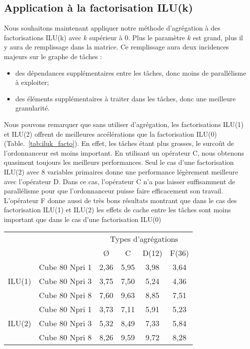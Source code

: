 \subsection{Application à la factorisation ILU(k)}
\label{sec:res_iluk}
Nous souhaitons maintenant appliquer notre méthode d'agrégation à des factorisations ILU(k) avec $k$ supérieur à 0.
%
Plus le paramètre $k$ est grand, plus il y aura de remplissage dans la matrice.
%
Ce remplissage aura deux incidences majeurs sur le graphe de tâches :
\begin{itemize}
  \item des dépendances supplémentaires entre les tâches, donc moins de parallélisme à exploiter;
  \item des éléments supplémentaires à traiter dans les tâches, donc une meilleure granularité.
\end{itemize}


Nous pouvons remarquer que sans utiliser d'agrégation, les factorisations ILU(1) et ILU(2) offrent de meilleures accélérations que la factorisation ILU(0) (Table.~\ref{tab:iluk_facto}).
%
En effet, les tâches étant plus grosses, le surcoût de l'ordonnanceur est moins important.
%
En utilisant un opérateur C, nous obtenons quasiment toujours les meilleurs performances.
%
Seul le cas d'une factorisation ILU(2) avec 8 variables primaires donne une performance légèrement meilleure avec l'opérateur D.
%
Dans ce cas, l'opérateur C n'a pas laisser suffisamment de parallélisme pour que l'ordonnanceur puisse faire efficacement son travail.
%
L'opérateur F donne aussi de très bons résultats montrant que dans le cas des factorisation ILU(1) et ILU(2) les effets de cache entre les tâches sont moins important que dans le cas d'une factorisation ILU(0)

\begin{center}
  \begin{tabular}{|c|r|c|c|c|c|}
    \hline
       &   & \multicolumn{4}{|c|}{Types d'agrégations}\\
       &                & \O   &  C   & D(12) & F(36) \\
    \hline
       & Cube 80 Npri 1 & 2,36 & 5,95 & 3,98  & 3,64\\
ILU(1) & Cube 80 Npri 3 & 3,75 & 7,50 & 5,24  & 4,36\\
       & Cube 80 Npri 8 & 7,60 & 9,63 & 8,85  & 7,51\\
    \hline
       & Cube 80 Npri 1 & 3,73 & 7,11 & 5,91  & 5,23\\
ILU(2) & Cube 80 Npri 3 & 5,32 & 8,49 & 7,33  & 5,84\\
       & Cube 80 Npri 8 & 8,26 & 9,59 & 9,72  & 8,28\\
    \hline
  \end{tabular}
  \label{tab:iluk_facto}
\end{center}
